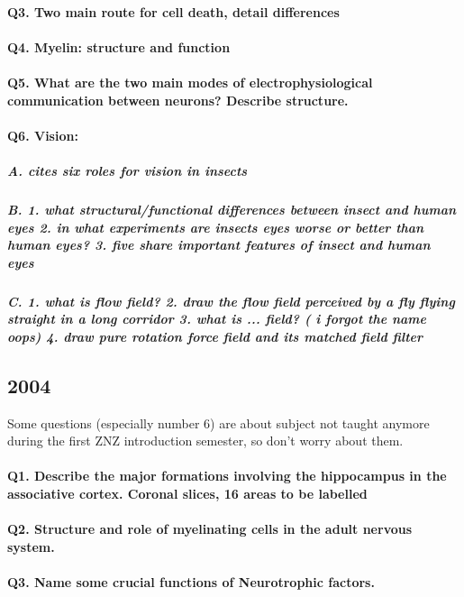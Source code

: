 \documentclass[12pt,article,oneside,a4paper]{memoir}
\begin{document}
\paragraph{Q3. Two main route for cell death, detail differences}

\paragraph{Q4. Myelin: structure and function}

\paragraph{Q5. What are the two main modes of electrophysiological communication between neurons? Describe structure.}

\paragraph{Q6. Vision:}
\subparagraph{A. cites six roles for vision in insects}
\subparagraph{B. 1. what structural/functional differences between insect and human eyes 2. in what experiments are insects eyes worse or better than human eyes? 3. five share important features of insect and human eyes}
\subparagraph{C. 1. what is flow field? 2. draw the flow field perceived by a fly flying straight in a long corridor 3. what is ... field? ( i forgot the name oops) 4. draw pure rotation force field and its matched field filter}


\subsection{2004}
Some questions (especially number 6) are about subject not taught anymore
during the first ZNZ introduction semester, so don't worry about them.

\paragraph{Q1. Describe the major formations involving the hippocampus in the associative cortex. Coronal slices, 16 areas to be labelled}
\paragraph{Q2. Structure and role of myelinating cells in the adult nervous system.}
\paragraph{Q3. Name some crucial functions of Neurotrophic factors.}
\end{document}
